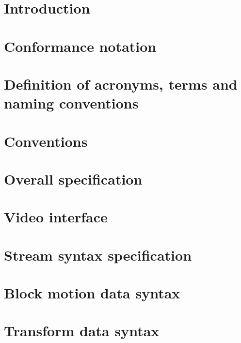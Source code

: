 
\section{Introduction}

\clearpage
\section{Conformance notation}

\clearpage
\section{Definition of acronyms, terms and naming conventions}

\clearpage
\section{Conventions}

\clearpage
\section{Overall specification}

\clearpage
\section{Video interface}

\clearpage
\section{Stream syntax specification}

\clearpage
\section{Block motion data syntax}

\clearpage
\section{Transform data syntax}

